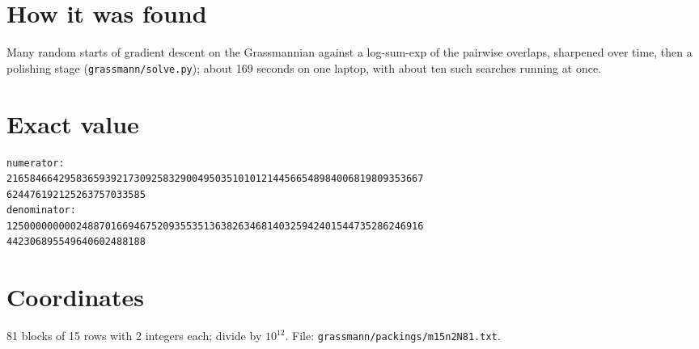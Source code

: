 \documentclass[11pt,a4paper]{article}
\begin{document}
\section{How it was found}
Many random starts of gradient descent on the Grassmannian against a log-sum-exp of the pairwise overlaps, sharpened over time, then a polishing stage (\texttt{grassmann/solve.py}); about 169 seconds on one laptop, with about ten such searches running at once.


\appendix
\section{Exact value}
{\small
\begin{verbatim}
numerator:
216584664295836593921730925832900495035101012144566548984006819809353667
624476192125263757033585
denominator:
125000000000248870166946752093553513638263468140325942401544735286246916
442306895549640602488188
\end{verbatim}}

\section{Coordinates}
81 blocks of 15 rows with 2 integers each; divide by $10^{12}$. File: \texttt{grassmann/packings/m15n2N81.txt}.
{\tiny
\begin{multicols}{4}
\end{multicols}}
\end{document}
